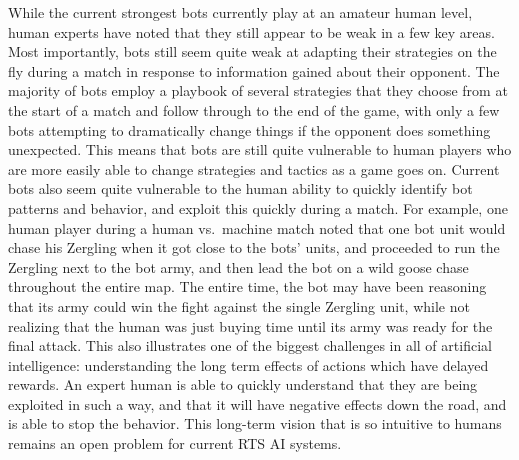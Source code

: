 While the current strongest bots currently play at an amateur human level, human experts have noted that they still appear to be weak in a few key areas. Most importantly, bots still seem quite weak at adapting their strategies on the fly during a match in response to information gained about their opponent. The majority of bots employ a playbook of several strategies that they choose from at the start of a match and follow through to the end of the game, with only a few bots attempting to dramatically change things if the opponent does something unexpected. This means that bots are still quite vulnerable to human players who are more easily able to change strategies and tactics as a game goes on. Current bots also seem quite vulnerable to the human ability to quickly identify bot patterns and behavior, and exploit this quickly during a match. For example, one human player during a human vs.\ machine match noted that one bot unit would chase his Zergling when it got close to the bots' units, and proceeded to run the Zergling next to the bot army, and then lead the bot on a wild goose chase throughout the entire map. The entire time, the bot may have been reasoning that its army could win the fight against the single Zergling unit, while not realizing that the human was just buying time until its army was ready for the final attack. This also illustrates one of the biggest challenges in all of artificial intelligence: understanding the long term effects of actions which have delayed rewards. An expert human is able to quickly understand that they are being exploited in such a way, and that it will have negative effects down the road, and is able to stop the behavior. This long-term vision that is so intuitive to humans remains an open problem for current RTS AI systems.



